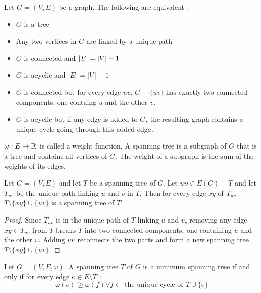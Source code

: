 \documentclass{cours}
\begin{document}
        \begin{proposition}
            Let $G = (V, E)$ be a graph. The following are equivalent : 
            \begin{itemize}
                \item $G$ is a tree
                \item Any two vertices in $G$ are linked by a unique path
                \item $G$ is connected and $\left|E\right| = \left|V\right| - 1$
                \item $G$ is acyclic and $\left|E\right| = \left|V\right| - 1$
                \item $G$ is connected but for every edge $uv$, $G - \{uv\}$ has exactly two connected components, one containg $u$ and the other $v$.
                \item $G$ is acyclic but if any edge is added to $G$, the resulting graph contains a unique cycle going through this added edge.
            \end{itemize}
        \end{proposition}

        \begin{definition}
            $\omega : E \to \mathbb{R}$ is called a weight function. A spanning tree is a subgraph of $G$ that is a tree and contains all vertices of $G$. The weight of a subgraph is the sum of the weights of its edges.
        \end{definition}


        \begin{proposition}
            Let $G = (V, E)$ and let $T$ be a spanning tree of $G$. Let $uv \in E(G) - T$ and let $T_{uv}$ be the unique path linking $u$ and $v$ in $T$. Then for every edge $xy$ of $T_{uv}$ $T\setminus \{xy\} \cup \{uv\}$ is a spanning tree of $T$. 
        \end{proposition}
        \begin{proof}
            Since $T_{uv}$ is in the unique path of $T$ linking $u$ and $v$, removing any edge $xy \in T_{uv}$ from $T$ breaks $T$ into two connected components, one containing $u$ and the other $v$. Adding $uv$ reconnects the two parts and form a new spanning tree $T \setminus \{xy\} \cup \{uv\}$.
        \end{proof}

        \begin{theorem}
            Let $G = \left(V, E, \omega\right)$. A spanning tree $T$ of $G$ is a minimum spanning tree if and only if for every edge $e \in E \setminus T$ :
            \[
                \omega(e) \geq \omega(f) \forall f \in \text{ the unique cycle of } T \cup \{e\}
            \]
        \end{theorem}
\end{document}
